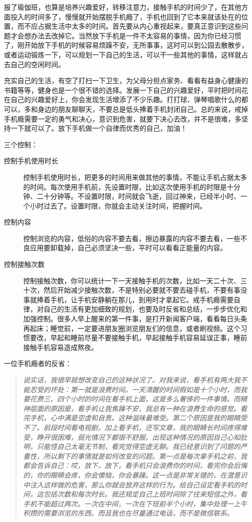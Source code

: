 报了瑜伽班，也算是培养兴趣爱好，转移注意力，接触手机的时间少了，在其他方面投入的时间多了，慢慢就开始摆脱手机瘾了，手机也回到了它本来就该处在的位置，而不应占据生活中太多的时间。首先要从内心重视起来，要真正意识到这些问题才会想办法去改掉它。当然放下手机是一件不太容易的事情，因为你已经习惯了，刚开始放下手机的时候容易烦躁不安，无所事事，这时可以到公园去散散步，或者运动锻炼一下，可以规划一下自己的生活，可以干一些其他的事情，这样就占去自己的空闲时间。

充实自己的生活，有空了打扫一下卫生，为父母分担点家务、看看有益身心健康的书籍等等，健身也是一个很不错的选择。发展一下自己的兴趣爱好，平时把时间花在自己的兴趣爱好上，你会发现生活增添了不少乐趣。打打球、弹琴唱歌什么的都可以，多和身边的朋友聊聊天，不要总是低头捧着手机封闭自己。总的来说，戒掉手机瘾需要一定的勇气和决心，意识到危害，就要下决心去改，并不是很难，多坚持一下就可以了。放下手机做一个自律而优秀的自己，加油！

三个控制：\begin{description}
    \item[控制手机使用时长] 控制手机使用时长，把更多的时间用来做其他的事情，不能让手机占据太多的时间。每次使用手机前，先设置时限，比如这次使用手机的时限是十分钟、二十分钟等。不设置时限，时间就会飞逝，回过神来，已经半小时、一个小时过去了。设置时限，你就会主动关注时间，把握时间。
    \item[控制内容] 控制浏览的内容，低俗的内容不要去看，擦边暴露的内容不要去看，一些不良应用要卸载掉，自己必须坚决一些，平时可以看看正能量的内容。
    \item[控制接触次数] 控制接触次数，你可以统计一下一天接触手机的次数，比如一天二十次、三十次，然后开始减少接触次数，不是特别必要就不要去碰手机，不要有事没事就捧着手机，让手机安静躺在那儿，到用时才拿起它。戒手机瘾需要自律，对自己的生活有更加细致的规划，也要及时反省和总结，一步步优化和加强控制。很多人早上醒来的第一件事，是打开新闻客户端，看看每日头条再起床；睡觉前，一定要进朋友圈浏览朋友们的信息，或者刷视频。这个习惯要改，早起和睡前尽量不要接触手机，早起接触手机容易延误正事，睡前接触手机容易造成熬夜。
\end{description}

一位手机瘾者的反省：

\begin{quote}\it
    说实话，我很早就想改变自己的这种状况了。对我来说，看手机有两大我不能忍受的坏处：第一就是浪费时间。一天清醒的时间假如是十个小时，而我要花费三、四个小时的时间在看手机上面，这是多么奢侈的一件事情。而精神层面的原因是，看手机让我焦躁不安，我总有一种在浪费生命的感觉。看完手机，心中满是空虚和自责。这种滋味最难受。第二个原因是我的眼睛受不了。前段时间看电视剧，加上看手机，还写文章，我的眼睛长时间疼得难受，睁开很困难，弱光情况下都很不舒服。出现这种情况的原因自己心知肚明，只能怪自己太毫无节制，看完觉得空虚无聊。我已经意识到了问题的严重性，所以剩下的事情就是如何改变的问题。第一点是每次拿手机之前，我都会告诉自己：哎，放下，放下，看手机只会浪费你的时间，看完你会后悔的，你的眼睛会疼，你会懊恼，你会暴躁。这一点是非常关键的，在潜意识中注入这样做的危害，那么你就会放弃这样的行为。给自己设定看手机的时间，这包括次数和每次时长。我还规定自己上班时间除了往来短信之外，看手机不能超过两次。一次在中间，一次在下班前半个小时，集中处理一上午积攒的需要浏览的东西。而且我也在尽量通过电话，而不是微信联系。
\end{quote}

